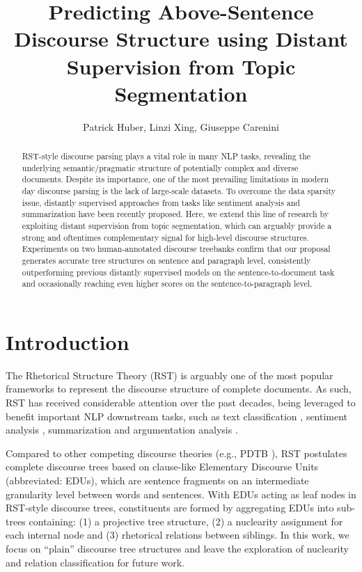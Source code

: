 \documentclass[letterpaper]{article} %
\title{Predicting Above-Sentence Discourse Structure using Distant Supervision from Topic Segmentation}
\author{
    Patrick Huber\equalcontrib,
    Linzi Xing\equalcontrib,
    Giuseppe Carenini
}
\begin{document}
\maketitle

\begin{abstract}
RST-style discourse parsing plays a vital role in many NLP tasks, revealing the underlying semantic/pragmatic structure of potentially complex and diverse documents. Despite its importance, one of the most prevailing limitations in modern day discourse parsing is the lack of large-scale datasets. To overcome the data sparsity issue, distantly supervised approaches from tasks like sentiment analysis and summarization have been recently proposed. Here, we extend this line of research by exploiting distant supervision from topic segmentation, which can arguably provide a strong and oftentimes complementary signal for high-level discourse structures. Experiments on two human-annotated discourse treebanks confirm that our proposal generates accurate tree structures on sentence and paragraph level, consistently outperforming previous distantly supervised models on the sentence-to-document task and occasionally reaching even higher scores on the sentence-to-paragraph level.
\end{abstract}

\section{Introduction}
The Rhetorical Structure Theory (RST) \cite{mann1988rhetorical} is arguably one of the most popular frameworks to represent the
discourse structure of complete documents. As such, RST has received considerable attention over the past decades, being leveraged to benefit important NLP downstream tasks, such as text classification \cite{ji-smith-2017-neural}, sentiment analysis \cite{bhatia-etal-2015-better, hogenboom2015using,  nejat-etal-2017-exploring, huber-carenini-2020-sentiment}, summarization \cite{Marcu1999, gerani-etal-2014-abstractive, xu-etal-2020-discourse, xiao-etal-2020-really} and argumentation analysis \cite{chakrabarty-etal-2019-ampersand}.

Compared to other competing discourse theories (e.g., PDTB \cite{prasad-etal-2008-penn}), RST postulates complete discourse trees based on clause-like Elementary Discourse Units (abbreviated: EDUs), which are sentence fragments on an intermediate granularity level between words and sentences. With EDUs acting as leaf nodes in RST-style discourse trees, constituents are formed by aggregating EDUs into sub-trees containing:
(1) a projective tree structure, (2) a nuclearity assignment for each internal node and (3) rhetorical relations between siblings. In this work, we focus on ``plain'' discourse tree structures and leave the exploration of nuclearity and relation classification for future work.
\end{document}

